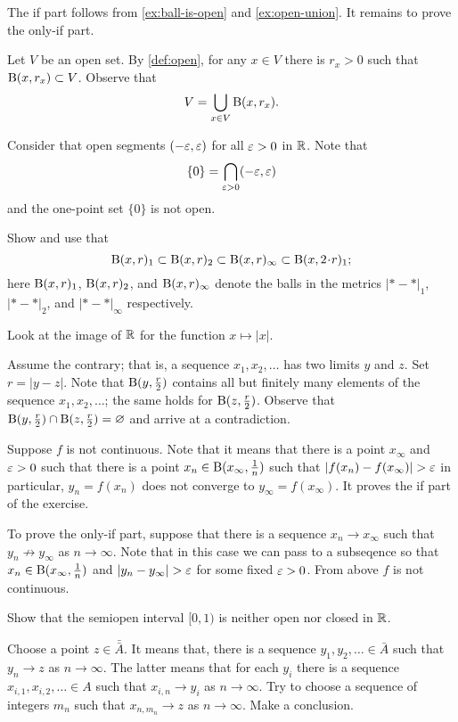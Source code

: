 \begin{multicols}{2}
 The if part follows from \ref{ex:ball-is-open} and \ref{ex:open-union}.
It remains to prove the only-if part.

Let $V$ be an open set. 
By \ref{def:open}, for any $x\in V$ there is $r_x>0$ such that $\mathrm{B}(x,r_x)\subset V$.
Observe that
\[V=\bigcup_{x\in V} \mathrm{B}(x,r_x).\]

Consider that open segments $(-\varepsilon,\varepsilon)$ for all $\varepsilon>0$ in $\mathbb{R}$.
Note that 
\[\{0\}=\bigcap_{\varepsilon>0}(-\varepsilon,\varepsilon)\]
and the one-point set $\{0\}$ is not open.

Show and use that 
\[\Ball(x,r)_1\subset \Ball(x,r)_2\subset \Ball(x,r)_\infty\subset \Ball(x,2\cdot r)_1;\]
here $\mathrm{B}(x,r)_1$, $\mathrm{B}(x,r)_2$, and $\mathrm{B}(x,r)_\infty$ denote the balls in the metrics $|{*}-{*}|_1$, $|{*}-{*}|_2$, and $|{*}-{*}|_\infty$ respectively.

Look at the image of $\mathbb{R}$ for the function $x\mapsto |x|$.

Assume the contrary; that is, a sequence $x_1,x_2,\dots$ has two limits $y$ and $z$.
Set $r=|y-z|$.
Note that $\mathrm{B}(y,\tfrac r2)$ contains all but finitely many elements of the sequence $x_1,x_2,\dots$;
the same holds for $\mathrm{B}(z,\tfrac r2)$.
Observe that $\mathrm{B}(y,\tfrac r2)\cap \mathrm{B}(z,\tfrac r2)=\varnothing$ and arrive at a contradiction.

Suppose $f$ is not continuous.
Note that it means that there is a point $x_\infty$ and $\varepsilon>0$ such that there is a point $x_n\in \mathrm{B}(x_\infty,\tfrac1n)$ such that $|f(x_n)-f(x_\infty)|>\eps$ in particular, $y_n=f(x_n)$ does not converge to $y_\infty=f(x_\infty)$. 
It proves the if part of the exercise.

To prove the only-if part, suppose that there is a sequence $x_n\to x_\infty$ such that $y_n\not\to y_\infty$ as $n\to \infty$.
Note that in this case we can pass to a subseqence so that $x_n\in \mathrm{B}(x_\infty,\tfrac1n)$ and $|y_n-y_\infty|>\eps$ for some fixed $\varepsilon>0$.
From above $f$ is not continuous.

Show that the semiopen interval $[0,1)$ is neither open nor closed in $\mathbb{R}$.

Choose a point $z\in \bar{\bar A}$.
It means that, there is a sequence $y_1,y_2,\dots\in\bar A$ such that $y_n\to z$ as $n\to\infty$.
The latter means that for each $y_i$ there is a sequence $x_{i,1}, x_{i,2},\dots\in A$ such that $x_{i,n}\to y_i$ as $n\to\infty$.
Try to choose a sequence of integers $m_n$ such that $x_{n,m_n}\to z$ as $n\to\infty$.
Make a conclusion.


\end{multicols}
